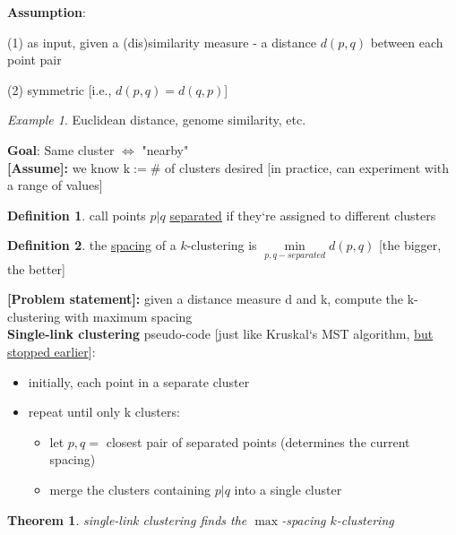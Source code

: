 \documentclass[a4paper,12pt]{article}
\theoremstyle{plain}
\newtheorem*{theorem}{Theorem}
\theoremstyle{definition}
\newtheorem*{definition}{Definition}
\theoremstyle{remark}
\newtheorem*{example}{Example}
\begin{document}
\textbf{Assumption}:
\begin{description}
	\item{(1)} as input, given a (dis)similarity measure - a distance $d(p, q)$ between each point pair
	\item{(2)} symmetric [i.e., $d(p, q) = d(q, p)$]
\end{description}

\begin{example}Euclidean distance, genome similarity, etc.\\\end{example}


\textbf{Goal}: Same cluster $\iff$ "nearby"
\\

\textbf{[Assume]:} we know k$:= \#$ of clusters desired [in practice, can experiment with a range of values]
\\

\begin{definition} call points $p|q$ \underline{separated} if they`re assigned to different clusters\end{definition}
\begin{definition} the \underline{spacing} of a $k$-clustering is $\min\limits_{p,q-separated} d(p, q)$ [the bigger, the better]\end{definition}

\textbf{[Problem statement]:} given a distance measure d and k, compute the k-clustering with maximum spacing
\\

\textbf{Single-link clustering} pseudo-code [just like Kruskal`s MST algorithm, \underline{but stopped earlier}]:
\begin{itemize}
\item initially, each point in a separate cluster
\item repeat until only k clusters:
	\begin{itemize}
		\item let $p, q =$ closest pair of separated points (determines the current spacing)
		\item merge the clusters containing $p|q$ into a single cluster
	\end{itemize}
\end{itemize}

\begin{theorem}single-link clustering finds the $\max$-spacing $k$-clustering\end{theorem}
\end{document}
